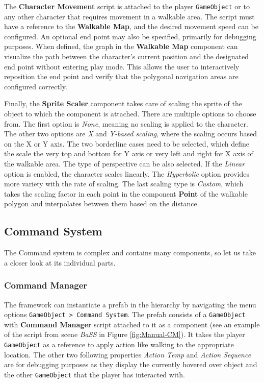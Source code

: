 The \textbf{Character Movement} script is attached to the player \verb|GameObject| or to any other character that requires movement in a walkable area. The script must have a reference to the \textbf{Walkable Map}, and the desired movement speed can be configured. An optional end point may also be specified, primarily for debugging purposes. When defined, the graph in the \textbf{Walkable Map} component can visualize the path between the character's current position and the designated end point without entering play mode. This allows the user to interactively reposition the end point and verify that the polygonal navigation areas are configured correctly.

Finally, the \textbf{Sprite Scaler} component takes care of scaling the sprite of the object to which the component is attached. There are multiple options to choose from. The first option is \textit{None}, meaning no scaling is applied to the character. The other two options are \textit{X }and \textit{Y-based scaling}, where the scaling occurs based on the X or Y axis. The two borderline cases need to be selected, which define the scale the very top and bottom for Y axis or very left and right for X axis of the walkable area. The type of perspective can be also selected. If the \textit{Linear} option is enabled, the character scales linearly. The \textit{Hyperbolic} option provides more variety with the rate of scaling. The last scaling type is \textit{Custom}, which takes the scaling factor in each point in the component \textbf{Point} of the walkable polygon and interpolates between them based on the distance.

\subsection{Command System}
\label{Manual:CS}
The Command system is complex and contains many components, so let us take a closer look at its individual parts.

\subsubsection{Command Manager}
\label{Manual:CM}
The framework can instantiate a prefab in the hierarchy by navigating the menu options \verb|GameObject > Command System|. The prefab consists of a \verb|GameObject| with \textbf{Command Manager} script attached to it as a component (see an example of  the script from scene \textit{BaSS} in Figure \ref{fig:Manual-CM}). It takes the player \verb|GameObject| as a reference to apply action like walking to the appropriate location. The other two following properties \textit{Action Temp} and \textit{Action Sequence} are for debugging purposes as they display the currently hovered over object and the other \verb|GameObject| that the player has interacted with.

